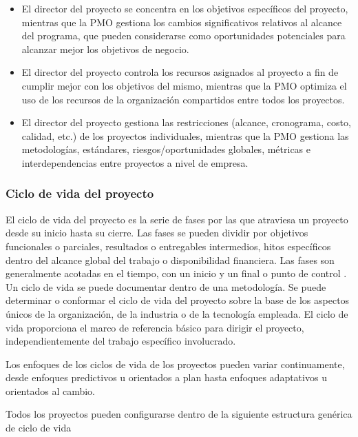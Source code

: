 \begin{itemize}

\item{El director del proyecto se concentra en los objetivos específicos del proyecto, mientras que la PMO gestiona los cambios significativos relativos al alcance del programa, que pueden considerarse como oportunidades potenciales para alcanzar mejor los objetivos de negocio.}

\item{El  director  del  proyecto  controla  los  recursos  asignados  al  proyecto  a  fin  de  cumplir  mejor  con  los  objetivos  del  mismo,  mientras  que  la  PMO  optimiza  el  uso  de  los  recursos  de  la  organización  compartidos entre todos los proyectos.}

\item{El  director  del  proyecto  gestiona  las  restricciones  (alcance,  cronograma,  costo,  calidad,  etc.)  de  los  proyectos  individuales,  mientras  que  la  PMO  gestiona  las  metodologías,  estándares,  riesgos/oportunidades globales, métricas e interdependencias entre proyectos a nivel de empresa.}

\end{itemize}


\subsubsection{Ciclo de vida del proyecto}

El ciclo de vida del proyecto es la serie de fases por las que atraviesa un proyecto desde su inicio hasta su cierre. Las fases se pueden dividir por objetivos funcionales o parciales, resultados o entregables intermedios, hitos específicos dentro del alcance global del trabajo o disponibilidad financiera. Las fases son generalmente acotadas en el tiempo, con un inicio y un final o punto de control . Un ciclo de vida se puede documentar dentro de una metodología. Se puede determinar o conformar el ciclo de vida del proyecto sobre la base de los aspectos únicos de la organización, de la industria o de la tecnología empleada. El ciclo de vida proporciona el marco de referencia básico para dirigir el proyecto, independientemente del trabajo específico involucrado.

Los enfoques de los ciclos de vida de los proyectos pueden variar continuamente, desde enfoques predictivos u orientados a plan hasta enfoques adaptativos u orientados al cambio.

Todos los proyectos pueden configurarse dentro de la siguiente estructura genérica de ciclo de vida

